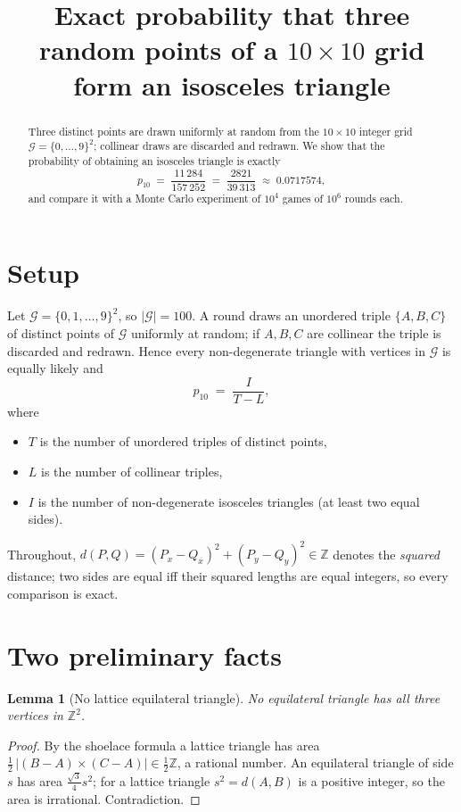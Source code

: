 \documentclass[11pt,a4paper]{article}
\title{Exact probability that three random points of a $10\times 10$ grid\\
form an isosceles triangle}
\author{}
\date{}
\newtheorem{lemma}{Lemma}
\theoremstyle{remark}
\newcommand{\G}{\mathcal{G}}
\begin{document}
\maketitle

\begin{abstract}
Three distinct points are drawn uniformly at random from the $10\times10$ integer
grid $\G=\{0,\dots,9\}^2$; collinear draws are discarded and redrawn. We show
that the probability of obtaining an isosceles triangle is exactly
\[
  p_{10} \;=\; \frac{11\,284}{157\,252} \;=\; \frac{2821}{39\,313} \;\approx\; 0.0717574,
\]
and compare it with a Monte Carlo experiment of $10^{4}$ games of $10^{6}$ rounds each.
\end{abstract}

\section{Setup}

Let $\G=\{0,1,\dots,9\}^2$, so $|\G|=100$. A round draws an unordered triple
$\{A,B,C\}$ of distinct points of $\G$ uniformly at random; if $A,B,C$ are
collinear the triple is discarded and redrawn. Hence every non-degenerate
triangle with vertices in $\G$ is equally likely and
\begin{equation}\label{eq:p}
  p_{10} \;=\; \frac{I}{T-L},
\end{equation}
where
\begin{itemize}
  \item $T$ is the number of unordered triples of distinct points,
  \item $L$ is the number of collinear triples,
  \item $I$ is the number of non-degenerate isosceles triangles (at least two equal sides).
\end{itemize}
Throughout, $d(P,Q)=(P_x-Q_x)^2+(P_y-Q_y)^2\in\mathbb{Z}$ denotes the \emph{squared}
distance; two sides are equal iff their squared lengths are equal integers, so
every comparison is exact.

\section{Two preliminary facts}

\begin{lemma}[No lattice equilateral triangle]\label{lem:equi}
No equilateral triangle has all three vertices in $\mathbb{Z}^2$.
\end{lemma}
\begin{proof}
By the shoelace formula a lattice triangle has area
$\tfrac12\,\lvert (B-A)\times(C-A)\rvert\in\tfrac12\mathbb{Z}$, a rational number.
An equilateral triangle of side $s$ has area $\tfrac{\sqrt3}{4}s^2$; for a
lattice triangle $s^2=d(A,B)$ is a positive integer, so the area is irrational.
Contradiction.
\end{proof}
\end{document}
